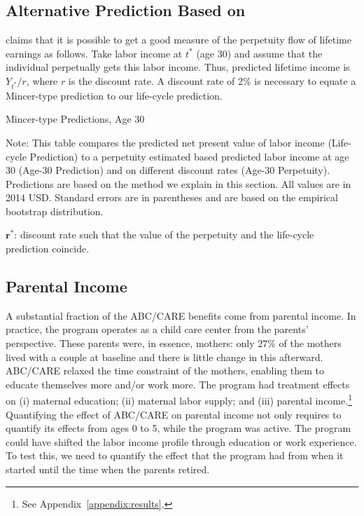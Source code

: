 \subsection{Alternative Prediction Based on \citet{Mincer_1974_schooling}}\label{app:mincer}

\citet{Mincer_1974_schooling} claims that it is possible to get a good measure of the perpetuity flow of lifetime earnings as follows. Take labor income at $t^*$ (age 30) and assume that the individual perpetually gets this labor income. Thus, predicted lifetime income is $Y_{t^*}/r$, where $r$ is the discount rate. A discount rate of 2\% is necessary to equate a Mincer-type prediction to our life-cycle prediction.

\begin{table}[!htbp]
\begin{threeparttable}
\caption{Mincer-type Predictions, Age 30}\label{tab:mincerpred}
\scriptsize
\centering

\begin{tablenotes}
\footnotesize
\item Note: This table compares the predicted net present value of labor income (Life-cycle Prediction) to a perpetuity estimated based predicted labor income at age 30 (Age-30 Prediction) and on different discount rates (Age-30 Perpetuity). Predictions are based on the method we explain in this section. All values are in 2014 USD. Standard errors are in parentheses and are based on the empirical bootstrap distribution.\\
\item $\bm{r^*}$: discount rate such that the value of the perpetuity and the life-cycle prediction coincide.
\end{tablenotes}
\end{threeparttable}
\end{table}


\subsection{Parental Income}\label{app:parentalincome}

\noindent A substantial fraction of the ABC/CARE benefits come from parental income. In practice, the program operates as a child care center from the parents' perspective. These parents were, in essence,  mothers: only $27\%$ of the mothers lived with a couple at baseline and there is little change in this afterward. ABC/CARE relaxed the time constraint of the mothers, enabling them to educate themselves more and/or work more. The program had treatment effects on (i) maternal education; (ii) maternal labor supply; and (iii) parental income.\footnote{See Appendix~\ref{appendix:results}.} Quantifying the effect of ABC/CARE on parental income not only requires to quantify its effects from ages 0 to 5, while the program was active. The program could have shifted the labor income profile through education or work experience. To test this, we need to quantify the effect that the program had from when it started until the time when the parents retired.\\ 


